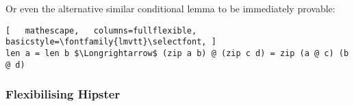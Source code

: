 \noindent Or even the alternative similar conditional lemma to be immediately provable:

\begin{lstlisting}[   mathescape,   columns=fullflexible,   basicstyle=\fontfamily{lmvtt}\selectfont, ]
len a = len b $\Longrightarrow$ (zip a b) @ (zip c d) = zip (a @ c) (b @ d)
\end{lstlisting}


\subsubsection*{Flexibilising Hipster}


